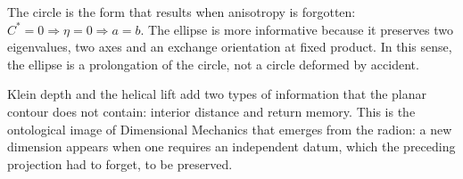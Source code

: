 The circle is the form that results when anisotropy is forgotten:
\(C^*=0\Rightarrow\eta=0\Rightarrow a=b\). The ellipse is more informative because
it preserves two eigenvalues, two axes and an exchange orientation at fixed
product. In this sense, the ellipse is a prolongation of the circle, not a circle
deformed by accident.

Klein depth and the helical lift add two types of information that the planar
contour does not contain: interior distance and return memory. This is the
ontological image of Dimensional Mechanics that emerges from the radion:
a new dimension appears when one requires an independent datum, which the
preceding projection had to forget, to be preserved.

